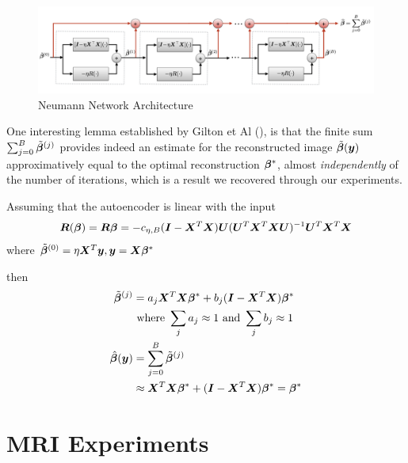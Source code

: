 \documentclass{article}
\begin{document}
\begin{figure}[H]
		\centering
		\captionsetup{justification=centering}
		\includegraphics[width=400pt]{nn_architecture}
		\caption{Neumann Network Architecture}
		\label{fig:nn_architecture}
\end{figure}
One interesting lemma established by Gilton et Al (\cite{DBLP:journals/corr/abs-1901-03707}), is that the finite sum $\sum_{j=0}^{B} \tilde{\bm{\beta}}^{(j)}$ provides indeed an estimate for the reconstructed image $\tilde{\bm{\beta}}(\bm{y})$  approximatively equal to the optimal reconstruction  $\bm{\beta}^{\ast}$, almost \emph{independently} of the number of iterations, which is a result we recovered through our experiments.

Assuming that the autoencoder is linear with the input 
$$
	\bm{R}(\bm{\beta}) = \bm{R} \bm{\beta} = -c_{\eta,B} ( \bm{I} - \bm{X}^T \bm{X}) 
	\bm{U} (\bm{U}^T   \bm{X}^T \bm{X}  \bm{U})^{-1} \bm{U}^T   \bm{X}^T \bm{X} 
$$ where $\tilde{\bm{\beta}}^{(0)} = \eta \bm{X}^T \bm{y}, \bm{y} = \bm{X} \bm{\beta}^{\ast}$

then
\begin{align*}
	\tilde{\bm{\beta}}^{(j)}			&=  a_j \bm{X}^T \bm{X} \bm{\beta}^* + b_j (\bm{I} - \bm{X}^T \bm{X} ) \bm{\beta}^{\ast} \\
		&\text{ where } \sum_j a_j \approx 1 \text{ and }  \sum_j b_j \approx 1  \\
	\hat{\bm{\beta}}(\bm{y})	&= \sum_{j=0}^B \tilde{\bm{\beta}}^{(j)} \\
						&\approx \bm{X}^T \bm{X}  \bm{\beta}^* + (\bm{I} - \bm{X}^T \bm{X} ) \bm{\beta}^* =   \bm{\beta}^{\ast} \\
\end{align*}

\section{MRI Experiments}
\label{MRIExperiments}
\end{document}
